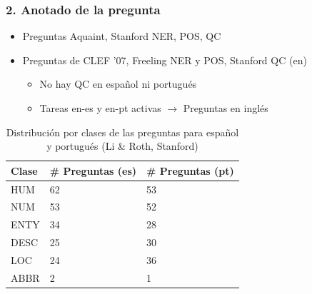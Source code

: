 \begin{frame}
\frametitle{2. Anotado de la pregunta}
  \begin{itemize}
    \item Preguntas Aquaint, Stanford NER, POS, QC
    \item Preguntas de CLEF '07, Freeling NER y POS, Stanford QC (en)
    \begin{itemize}
        \item No hay QC en español ni portugués
        \item Tareas en-es y en-pt activas $\rightarrow$ Preguntas en inglés
    \end{itemize}
  \end{itemize}

  \begin{table}
    \centering
    \begin{center}
    \begin{tabular}{| l | l | l | }
    \hline
    Clase & \# Preguntas (es)  & \# Preguntas (pt)\\ \hline
    HUM &  62 & 53 \\ \hline
    NUM &  53 & 52\\ \hline
    ENTY &  34 & 28\\ \hline
    DESC &  25 & 30\\ \hline
    LOC &  24 & 36\\ \hline
    ABBR &  2 & 1\\ \hline
    \end{tabular}
    \caption{Distribución por clases de las preguntas para español y portugués (Li \& Roth, Stanford)}
    \label{table:qc-es-pt}
    \end{center}
  \end{table}
\end{frame}

